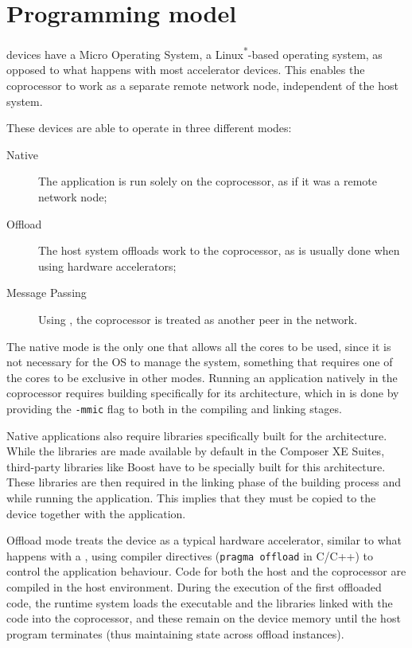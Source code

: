 \documentclass[../thesis]{subfiles}
\begin{document}
	\section{Programming model}
	\label{sec:mic:programming}

	\intel\mic devices \cite{Intel:MIC:QuickStartGuide} have a Micro Operating System, a Linux\textsuperscript{*}-based operating system, as opposed to what happens with most accelerator devices. This enables the coprocessor to work as a separate remote network node, independent of the host system.

	These devices are able to operate in three different modes:
		\begin{description}
			\item [Native] The application is run solely on the coprocessor, as if it was a remote network node;
			\item [Offload] The host system offloads work to the coprocessor, as is usually done when using hardware accelerators;
			\item [Message Passing] Using \mpi, the coprocessor is treated as another peer in the network.
		\end{description}

	The native mode is the only one that allows all the cores to be used, since it is not necessary for the OS to manage the system, something that requires one of the cores to be exclusive in other modes. Running an application natively in the coprocessor requires building specifically for its architecture, which in \icpc is done by providing the \texttt{-mmic} flag to both in the compiling and linking stages.

	Native applications also require libraries specifically built for the \intel\mic architecture. While the \intel libraries are made available by default in the \intel Composer XE Suites, third-party libraries like Boost have to be specially built for this architecture. These libraries are then required in the linking phase of the building process and while running the application. This implies that they must be copied to the device together with the application. 

	Offload mode treats the device as a typical hardware accelerator, similar to what happens with a \gpu, using compiler directives (\texttt{pragma offload} in C/C++) to control the application behaviour. Code for both the host and the coprocessor are compiled in the host environment. During the execution of the first offloaded code, the runtime system loads the executable and the libraries linked with the code into the coprocessor, and these remain on the device memory until the host program terminates (thus maintaining state across offload instances).
\end{document}
